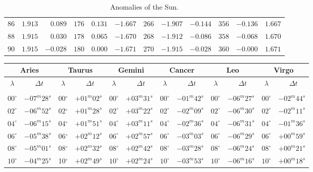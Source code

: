 \begin{table}[!h]
{\begin{tabular}{rrr|rrr|rrr|rrr}
 $86$ &  $1.913$ &  $0.089$ & $176$ &  $0.131$ & $-1.667$ & $266$ & $-1.907$ & $-0.144$ & $356$ & $-0.136$ &  $1.667$\\
 $88$ &  $1.915$ &  $0.030$ & $178$ &  $0.065$ & $-1.670$ & $268$ & $-1.912$ & $-0.086$ & $358$ & $-0.068$ &  $1.670$\\
 $90$ &  $1.915$ & $-0.028$ & $180$ &  $0.000$ & $-1.671$ & $270$ & $-1.915$ & $-0.028$ & $360$ & $-0.000$ &  $1.671$\\ 
\end{tabular}}
\caption{Anomalies of the Sun.}\label{lt6}
\end{table}

\clearpage
\begin{table}[!h]
\vspace{0.25cm}
\centering
{\scriptsize \begin{tabular}{cr|cr|cr|cr|cr|cr}
\multicolumn{2}{c}{Aries}\vline & \multicolumn{2}{c}{Taurus} \vline& \multicolumn{2}{c}{Gemini} \vline& \multicolumn{2}{c}{Cancer}\vline &
\multicolumn{2}{c}{Leo}\vline & \multicolumn{2}{c}{Virgo}\\\hline
$\lambda$& $\Delta t~~~~~$& $\lambda$& $\Delta t~~~~~$& $\lambda$& $\Delta t~~~~~$& $\lambda$& $\Delta t~~~~~$& $\lambda$& $\Delta t~~~~~$& $\lambda$& $\Delta t~~~~~$\\\hline
&&&&&&&&&&&\\[-2ex]
$00^\circ$ & $-07^m28^s$ & 00$^\circ$ & $+01^m02^s$ & $00^\circ$ & $+03^m31^s$ & $00^\circ$ & $-01^m42^s$ & $00^\circ$ & $-06^m27^s$ & $00^\circ$ & $-02^m44^s$\\
$02^\circ$ & $-06^m52^s$ & 02$^\circ$ & $+01^m28^s$ & $02^\circ$ & $+03^m22^s$ & $02^\circ$ & $-02^m09^s$ & $02^\circ$ & $-06^m30^s$ & $02^\circ$ & $-02^m11^s$\\
$04^\circ$ & $-06^m15^s$ & 04$^\circ$ & $+01^m51^s$ & $04^\circ$ & $+03^m11^s$ & $04^\circ$ & $-02^m36^s$ & $04^\circ$ & $-06^m31^s$ & $04^\circ$ & $-01^m36^s$\\
$06^\circ$ & $-05^m38^s$ & 06$^\circ$ & $+02^m12^s$ & $06^\circ$ & $+02^m57^s$ & $06^\circ$ & $-03^m03^s$ & $06^\circ$ & $-06^m29^s$ & $06^\circ$ & $+00^m59^s$\\
$08^\circ$ & $-05^m01^s$ & 08$^\circ$ & $+02^m32^s$ & $08^\circ$ & $+02^m42^s$ & $08^\circ$ & $-03^m28^s$ & $08^\circ$ & $-06^m24^s$ & $08^\circ$ & $+00^m21^s$\\
$10^\circ$ & $-04^m25^s$ & 10$^\circ$ & $+02^m49^s$ & $10^\circ$ & $+02^m24^s$ & $10^\circ$ & $-03^m53^s$ & $10^\circ$ & $-06^m16^s$ & $10^\circ$ & $+00^m18^s$\\

\end{tabular}}
\end{table}

